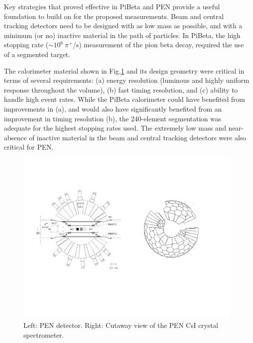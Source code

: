 Key strategies that proved effective in PiBeta
and PEN provide a useful foundation to build on for the proposed
measurements.
Beam and central tracking detectors need to be designed with as low mass
as possible, and with a minimum (or no) inactive material in the path of
particles.  In PiBeta, the high stopping rate ($\sim 10^6\ \pi^+$/s)
measurement of the pion beta decay, required the use of a segmented
target.  

The calorimeter material shown in Fig.\ref{fig:PEN} and its design geometry were critical in terms
of several requirements: (a)  energy resolution (luminous and
highly uniform response throughout the volume), (b) fast timing
resolution, and (c) ability to handle high event rates.  While the
PiBeta calorimeter could have benefited from improvements in (a),
and would also have significantly benefited from an improvement in
timing resolution (b), the 240-element segmentation was adequate for the
highest stopping rates used. 
The extremely low mass and near-absence of inactive material in the beam
and central tracking detectors were also critical for PEN.  

\begin{figure}[h!]
\centering
\vspace{-20mm}
\includegraphics[scale=0.6]{sections/figures/PEN figure.pdf}
\vspace{-40mm}
\caption{Left: PEN detector. Right: Cutaway view of the PEN CsI crystal spectrometer\cite{Pocanic1,Pocanic2,Pocanic6}.}
\label{fig:PEN}
\end{figure}
